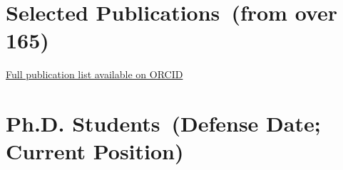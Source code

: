 \documentclass[11pt,a4paper,sans]{moderncv}        %
\makeatletter
\renewcommand*{\bibliographyitemlabel}{\@biblabel{\arabic{enumiv}}}
\makeatother
\begin{document}



\section{Selected Publications~(from over 165)} %

\href{https://orcid.org/0000-0003-1673-0473}{Full publication list available on ORCID}

\vspace{-.2in}
\renewcommand{\refname}{}
\nocite{*}

%
%  

%
%   


    
 


\section{Ph.D. Students~(Defense Date; Current Position)}

\end{document}
